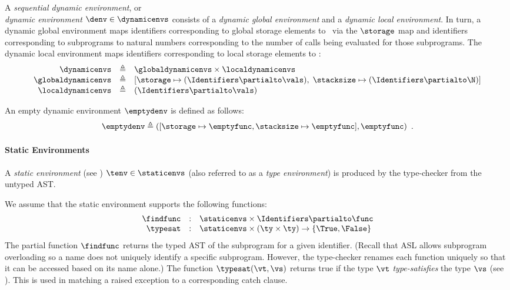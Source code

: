 \hypertarget{def-dynamicenvs}{}
\begin{definition}
A \emph{sequential dynamic environment}, or \\ \emph{dynamic environment}
$\denv \in \dynamicenvs$
consists of a \emph{dynamic global environment} and a \emph{dynamic local environment}.
In turn, a dynamic global environment maps identifiers corresponding to global storage elements to \nativevalues\
via the $\storage$ map and identifiers corresponding to subprograms to natural numbers corresponding
to the number of calls being evaluated for those subprograms.
The dynamic local environment maps identifiers corresponding to local storage elements to \nativevalues:
\[
\begin{array}{rcl}
\dynamicenvs        &\triangleq&  \globaldynamicenvs \times \localdynamicenvs \\
\globaldynamicenvs  &\triangleq&  [\storage \mapsto (\Identifiers \partialto \vals),\; \stacksize \mapsto (\Identifiers \partialto \N)]\\
\localdynamicenvs   &\triangleq&  (\Identifiers \partialto \vals) \\
\end{array}
\]
\end{definition}

\hypertarget{def-emptydenv}{}
An empty dynamic environment $\emptydenv$ is defined as follows:
\[
\emptydenv \triangleq ([\storage \mapsto \emptyfunc, \stacksize \mapsto \emptyfunc], \emptyfunc) \enspace.
\]

\paragraph{Static Environments}
A \emph{static environment} (see ) $\tenv \in \staticenvs$ (also referred to as a \emph{type environment})
is produced by the type-checker from the untyped AST.

We assume that the static environment supports the following functions:
\hypertarget{def-findfunc}{}
\[
  \begin{array}{rcl}
    \findfunc       &:& \staticenvs \times \Identifiers \partialto \func\\
    \typesat  &:& \staticenvs \times (\ty \times \ty) \rightarrow \{\True, \False\}
  \end{array}
\]
The partial function $\findfunc$ returns the typed AST of the subprogram for a given identifier.
(Recall that ASL allows subprogram overloading so a name does not uniquely identify
a specific subprogram.
However, the type-checker renames each function uniquely so that it can be accessed based
on its name alone.)
%
The function $\typesat(\vt, \vs)$ returns true
if the type $\vt$ \emph{type-satisfies} the type $\vs$
(see ).
This is used in matching a raised exception to a corresponding catch clause.

